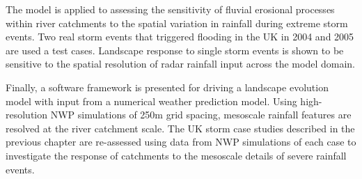 The model is applied to assessing the sensitivity of fluvial erosional processes within river catchments to the spatial variation in rainfall during extreme storm events. Two real storm events that triggered flooding in the UK in 2004 and 2005 are used a test cases. Landscape response to single storm events is shown to be sensitive to the spatial resolution of radar rainfall input across the model domain.

Finally, a software framework is presented for driving a landscape evolution model with input from a numerical weather prediction model. Using high-resolution NWP simulations of 250m grid spacing, mesoscale rainfall features are resolved at the river catchment scale. The UK storm case studies described in the previous chapter are re-assessed using data from NWP simulations of each case to investigate the response of catchments to the mesoscale details of severe rainfall events.


%
%
%

